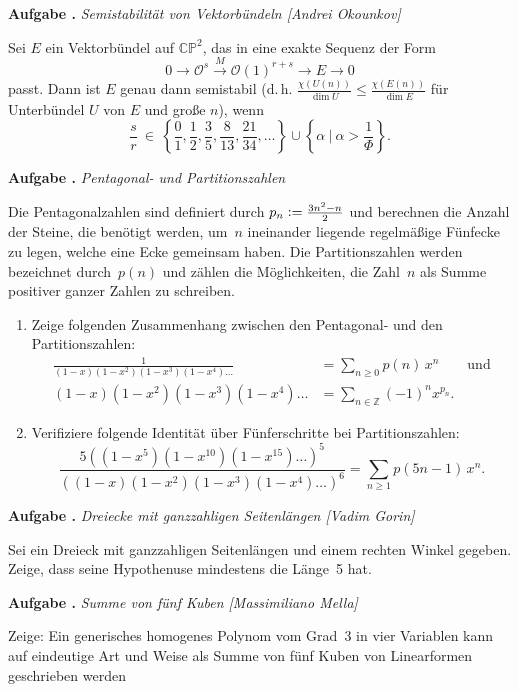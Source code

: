 \documentclass[a4paper,ngerman]{scrartcl}
\newcommand{\defeq}{\vcentcolon=}
\newlength{\aufgabenskip}
\newcounter{aufgabennummer}
\newenvironment{aufgabe}[1]{
  \addtocounter{aufgabennummer}{1}
  \textbf{Aufgabe \theaufgabennummer.} \emph{#1} \par
}{\vspace{\aufgabenskip}}
\begin{document}
\begin{aufgabe}{Semistabilität von Vektorbündeln [Andrei Okounkov]}
Sei $E$ ein Vektorbündel auf $\mathbb{CP}^2$, das in eine exakte Sequenz der
Form
\[
0 \longrightarrow \mathcal{O}^s \stackrel{M}{\longrightarrow} \mathcal{O}(1)^{r+s} \longrightarrow E \longrightarrow 0
\]
passt. Dann ist $E$ genau dann semistabil (d.\,h. $\tfrac{\chi(U(n))}{\dim U}\leq\tfrac{\chi(E(n))}{\dim E}$ für Unterbündel $U$ von $E$ und große $n$), wenn 
\[
\frac{s}{r}\ \in\
\left\{\frac{0}{1},\frac{1}{2},\frac{3}{5},\frac{8}{13},\frac{21}{34},\ldots
\right\} \cup \left\{ \alpha\ |\ \alpha > \frac{1}{\Phi} \right\}. \]
\end{aufgabe}
\vspace*{-1em}

\begin{aufgabe}{Pentagonal- und Partitionszahlen}
Die Pentagonalzahlen sind definiert durch $p_n \defeq \tfrac{3n^2-n}{2}$ und
berechnen die Anzahl der Steine, die benötigt werden, um~$n$ ineinander
liegende regelmäßige Fünfecke zu legen, welche eine Ecke gemeinsam haben. Die
Partitionszahlen werden bezeichnet durch~$p(n)$ und zählen die Möglichkeiten,
die Zahl~$n$ als Summe positiver ganzer Zahlen zu schreiben.
\begin{enumerate}
\item Zeige folgenden Zusammenhang zwischen den Pentagonal- und den
Partitionszahlen:
\begin{align*}
\frac{1}{(1-x)(1-x^2)(1-x^3)(1-x^4)\ldots} &= \sum_{n\geq 0} p(n) \,x^n \qquad\text{und} \\
(1-x)(1-x^2)(1-x^3)(1-x^4)\ldots &= \sum_{n \in \mathbb{Z}} (-1)^n x^{p_n}.
\end{align*}
\item Verifiziere folgende Identität über Fünferschritte bei Partitionszahlen:
\[
\frac{5\left((1-x^5)(1-x^{10})(1-x^{15})\ldots \right)^5 }{\left((1-x)(1-x^2)(1-x^3)(1-x^4)\ldots\right)^6} 
= \sum_{n\geq 1} p(5n-1)\,x^n. \]
\end{enumerate}
\end{aufgabe}

\begin{aufgabe}{Dreiecke mit ganzzahligen Seitenlängen [Vadim Gorin]}
Sei ein Dreieck mit ganzzahligen Seitenlängen und einem rechten Winkel gegeben.
Zeige, dass seine Hypothenuse mindestens die Länge~5 hat.
\end{aufgabe}

\begin{aufgabe}{Summe von fünf Kuben [Massimiliano Mella]}
Zeige: Ein generisches homogenes Polynom vom Grad~3 in vier Variablen kann auf
eindeutige Art und Weise als Summe von fünf Kuben von Linearformen geschrieben werden
\end{aufgabe}
\end{document}
